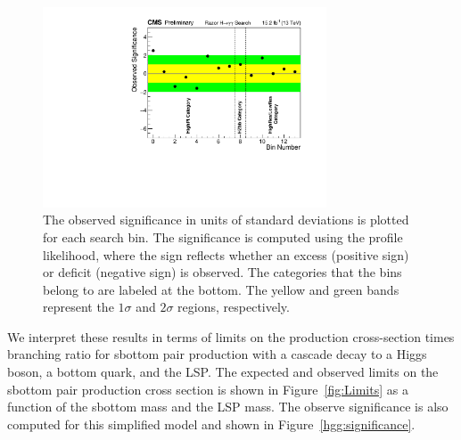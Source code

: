 \begin{figure}[ht!]
\centering
\includegraphics[width=0.75\textwidth, angle=0.]{figs/SignificanceVsBin.pdf}
\caption{ 
The observed significance in units of standard deviations
is plotted for each search bin. The significance is computed using the profile likelihood, where the sign
reflects whether an excess (positive sign) or deficit (negative sign) is observed. 
The categories that the bins belong to are labeled at the bottom.
The yellow and green bands represent the $1\sigma$ and $2\sigma$
regions, respectively. 
\label{fig:Significance}}
\end{figure}


We interpret these results in terms of limits on the production cross-section times
branching ratio for sbottom pair production with a cascade decay to a Higgs 
boson, a bottom quark, and the LSP. The expected and observed limits on the sbottom pair production cross section 
is shown in Figure~\ref{fig:Limits} as a function of the
sbottom mass and the LSP mass. The observe significance is also
computed for this simplified model and shown in Figure~\ref{hgg:significance}.

